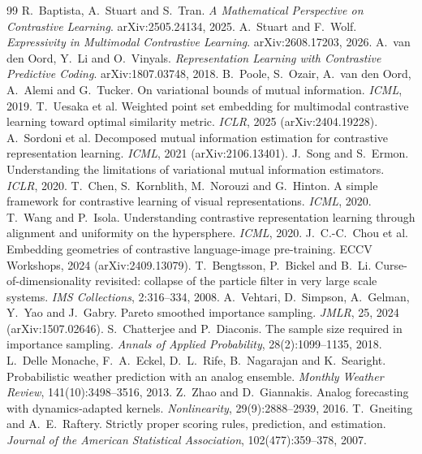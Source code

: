 \documentclass[11pt]{article}
\theoremstyle{plain}
\theoremstyle{definition}
\theoremstyle{remark}
\begin{document}
\begin{thebibliography}{99}
 R.~Baptista, A.~Stuart and S.~Tran.
  \emph{A Mathematical Perspective on Contrastive Learning}. arXiv:2505.24134, 2025.
 A.~Stuart and F.~Wolf.
  \emph{Expressivity in Multimodal Contrastive Learning}. arXiv:2608.17203, 2026.
 A.~van den Oord, Y.~Li and O.~Vinyals.
  \emph{Representation Learning with Contrastive Predictive Coding}. arXiv:1807.03748, 2018.
 B.~Poole, S.~Ozair, A.~van den Oord, A.~Alemi and G.~Tucker.
  On variational bounds of mutual information. \emph{ICML}, 2019.
 T.~Uesaka et al.
  Weighted point set embedding for multimodal contrastive learning toward optimal
  similarity metric. \emph{ICLR}, 2025 (arXiv:2404.19228).
 A.~Sordoni et al.
  Decomposed mutual information estimation for contrastive representation learning.
  \emph{ICML}, 2021 (arXiv:2106.13401).
 J.~Song and S.~Ermon.
  Understanding the limitations of variational mutual information estimators. \emph{ICLR}, 2020.
 T.~Chen, S.~Kornblith, M.~Norouzi and G.~Hinton.
  A simple framework for contrastive learning of visual representations. \emph{ICML}, 2020.
 T.~Wang and P.~Isola.
  Understanding contrastive representation learning through alignment and uniformity on the
  hypersphere. \emph{ICML}, 2020.
 J.~C.-C.~Chou et al.
  Embedding geometries of contrastive language-image pre-training. ECCV Workshops, 2024
  (arXiv:2409.13079).
 T.~Bengtsson, P.~Bickel and B.~Li.
  Curse-of-dimensionality revisited: collapse of the particle filter in very large scale
  systems. \emph{IMS Collections}, 2:316--334, 2008.
 A.~Vehtari, D.~Simpson, A.~Gelman, Y.~Yao and J.~Gabry.
  Pareto smoothed importance sampling. \emph{JMLR}, 25, 2024 (arXiv:1507.02646).
 S.~Chatterjee and P.~Diaconis.
  The sample size required in importance sampling.
  \emph{Annals of Applied Probability}, 28(2):1099--1135, 2018.
 L.~Delle Monache, F.~A.~Eckel, D.~L.~Rife, B.~Nagarajan and K.~Searight.
  Probabilistic weather prediction with an analog ensemble. \emph{Monthly Weather Review},
  141(10):3498--3516, 2013.
 Z.~Zhao and D.~Giannakis.
  Analog forecasting with dynamics-adapted kernels. \emph{Nonlinearity}, 29(9):2888--2939, 2016.
 T.~Gneiting and A.~E.~Raftery.
  Strictly proper scoring rules, prediction, and estimation. \emph{Journal of the American
  Statistical Association}, 102(477):359--378, 2007.
\end{thebibliography}
\end{document}

